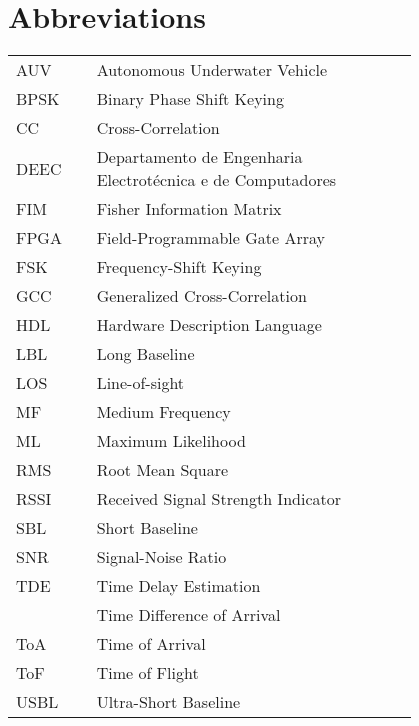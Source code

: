 \chapter*{Abbreviations}

\begin{flushleft}
\begin{tabular}{l p{0.8\linewidth}}
AUV		& Autonomous Underwater Vehicle \\
BPSK    & Binary Phase Shift Keying \\
CC 		  & Cross-Correlation \\
DEEC	& Departamento de Engenharia Electrotécnica e de Computadores \\
FIM		  & Fisher Information Matrix \\
FPGA    & Field-Programmable Gate Array \\
FSK		  & Frequency-Shift Keying \\
GCC      & Generalized Cross-Correlation \\
HDL		 & Hardware Description Language\\
LBL		  & Long Baseline\\
LOS		 & Line-of-sight\\
MF		  & Medium Frequency \\
ML		  & Maximum Likelihood \\
RMS		 & Root Mean Square \\
RSSI 	  & Received Signal Strength Indicator \\
SBL		  & Short Baseline \\
SNR		 & Signal-Noise Ratio\\
TDE 	 & Time Delay Estimation \\
   & Time Difference of Arrival \\
ToA	   	& Time of Arrival \\
ToF		 & Time of Flight \\
USBL    & Ultra-Short Baseline
\end{tabular}
\end{flushleft}